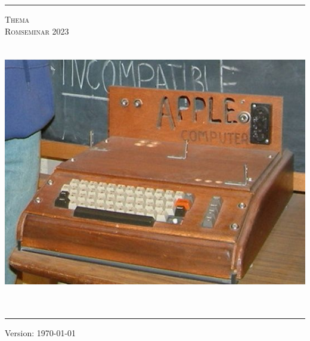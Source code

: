\begin{titlepage}
	\newcommand{\HRule}{\rule{\linewidth}{.25mm}}
	\HRule
	\vspace*{10pt}
	\begin{center}
	  {\Huge\scshape Thema \\[5mm]
				Romseminar 2023 \\ }
	\vspace*{15pt}
	\includegraphics[width=14cm, height=12cm, keepaspectratio=true]{./content/gruppenbild}
	\vspace*{10pt}	  
	\end{center}
	\HRule
	\begin{center}
	  {Version: \today }
	\end{center}
\end{titlepage}
